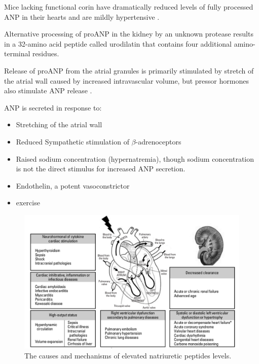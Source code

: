 \documentclass[14pt,a4paper,onecolumn]{extarticle}
\begin{document}
Mice lacking functional corin have dramatically reduced levels of fully processed ANP in their hearts and are mildly hypertensive \citep{Chan2005}. %

Alternative processing of proANP in the kidney by an unknown protease results in a 32-amino acid peptide called urodilatin that contains four additional amino-terminal residues. %

Release of proANP from the atrial granules is primarily stimulated by stretch of the atrial wall caused by increased intravascular volume, but pressor hormones also stimulate ANP release \citep{Ruskoaho2003}. %



ANP is secreted in response to:

    \begin{itemize}

        \item Stretching of the atrial wall \citep{Widmaier2008}

        \item Reduced Sympathetic stimulation of $\beta$-adrenoceptors

        \item Raised sodium concentration (hypernatremia), though sodium concentration is not the direct stimulus for increased ANP secretion. \citep{Widmaier2008}

        \item Endothelin, a potent vasoconstrictor

        \item exercise \citep{Kokkonen2002}

    \end{itemize}





\begin{figure}

    \centering

    \includegraphics[scale=0.3]{../../images/NP_causes.png}

    \small\caption{The causes and mechanisms of elevated natriuretic peptides levels.}

    \label{NP_causes}

\end{figure}
\end{document}
